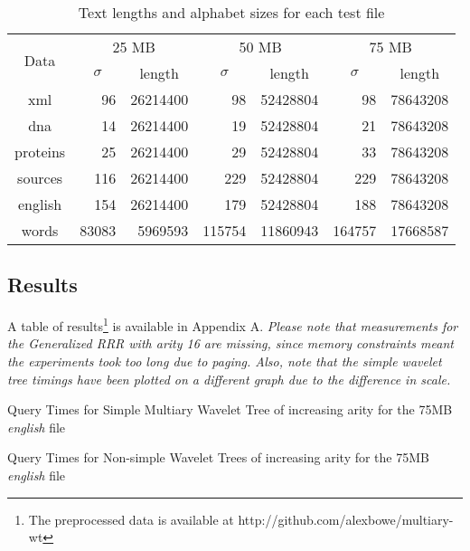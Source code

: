 \begin{center}
\begin{table}[h]
\begin{tabular}{crrrrrr}
\toprule
\multirow{2}{*}{Data} & \multicolumn{2}{c}{25 MB} & \multicolumn{2}{c}{50 MB} &  
	\multicolumn{2}{c}{75 MB}\\
		  \cmidrule(r){2-7}
	      &\multicolumn{1}{c}{$\sigma$}& \multicolumn{1}{c}{length}
		  &\multicolumn{1}{c}{$\sigma$}&\multicolumn{1}{c}{length}
		  &\multicolumn{1}{c}{$\sigma$}&\multicolumn{1}{c}{length}\\
\midrule
xml 	  & 96	   & 26214400 & 98 	   & 52428804 & 98 	   & 78643208 \\
dna 	  & 14     & 26214400 & 19 	   & 52428804 & 21     & 78643208 \\
proteins  & 25     & 26214400 & 29     & 52428804 & 33     & 78643208 \\
sources   & 116    & 26214400 & 229    & 52428804 & 229    & 78643208 \\
english   & 154    & 26214400 & 179    & 52428804 & 188    & 78643208 \\
words     & 83083  & 5969593  & 115754 & 11860943 & 164757 & 17668587 \\
\bottomrule
\end{tabular}
\caption{Text lengths and alphabet sizes for each test file}
\label{tab:files}
\end{table}
\end{center}

\newpage
\subsection{Results}
A table of results\footnote{The preprocessed data is available at
http://github.com/alexbowe/multiary-wt} is available in Appendix A. \emph{Please 
note that 
measurements for the Generalized RRR with arity 16 are missing, since memory 
constraints meant the experiments took too long due to paging. Also, note that
the simple wavelet tree timings have been plotted on a different graph due to
the difference in scale.}



			{Query Times for Simple Multiary Wavelet Tree of increasing arity
			for the 75MB \emph{english} file}
			
			{Query Times for Non-simple Wavelet Trees of increasing arity
			for the 75MB \emph{english} file}
			
